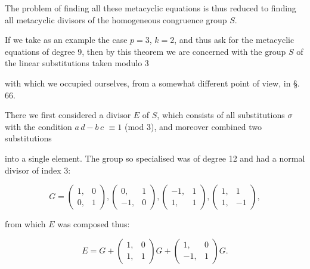 
The problem of finding all these metacyclic equations is
thus reduced to finding all metacyclic divisors of the homogeneous
congruence group $S$.

If we take as an example the case $p = 3$, $k = 2$, and thus
ask for the metacyclic equations of degree 9, then by this
theorem we are concerned with the group $S$ of the linear
substitutions taken modulo 3


with which we occupied ourselves, from a somewhat different
point of view, in \S.\,66.

There we first considered a divisor $E$ of $S$, which consists
of all substitutions $\sigma$ with the condition $a\,d - b\,c$
$\equiv 1$ (mod 3), and moreover combined two substitutions


into a single element. The group so specialised was of
degree 12 and had a normal divisor of index 3:

\[ G = \begin{pmatrix} 1, & 0 \\ 0, & 1 \end{pmatrix}, \begin{pmatrix} 0, & 1 \\ -1, & 0 \end{pmatrix}, \begin{pmatrix} -1, & 1 \\ 1, & 1 \end{pmatrix}, \begin{pmatrix} 1, & 1 \\ 1, & -1 \end{pmatrix}, \]

from which $E$ was composed thus:

\[ E = G + \begin{pmatrix} 1, & 0 \\ 1, & 1 \end{pmatrix} G + \begin{pmatrix} 1, & 0 \\ -1, & 1 \end{pmatrix} G. \]


